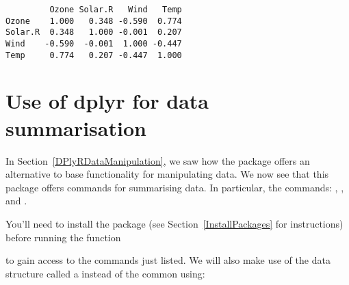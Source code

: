 \begin{knitrout}
\color{fgcolor}\begin{kframe}
\begin{alltt}
\hlstd{> }\hlstd{(}\hlstd{(}
\hlstd{   } \hlstd{=} \hlstd{,}  \hlstd{=} \hlstd{),} \hlstd{)}
\end{alltt}
\begin{verbatim}
         Ozone Solar.R   Wind   Temp
Ozone    1.000   0.348 -0.590  0.774
Solar.R  0.348   1.000 -0.001  0.207
Wind    -0.590  -0.001  1.000 -0.447
Temp     0.774   0.207 -0.447  1.000
\end{verbatim}
\end{kframe}
\end{knitrout}
 
 
 
 
\section{Use of dplyr for data summarisation} 
\label{DPlyRDataSummarisation} 
 
 
In Section~\ref{DPlyRDataManipulation}, we saw how the  package offers an alternative to base \R{} functionality for manipulating data. We now see that this package offers commands for summarising data. In particular, the commands: , , and . 
   
You'll need to install the package (see Section~\ref{InstallPackages} for instructions) before running the function 
\begin{knitrout}
\color{fgcolor}\begin{kframe}
\begin{alltt}
\hlstd{> }
\end{alltt}
\end{kframe}
\end{knitrout}
to gain access to the commands just listed. We will also make use of the  data structure called a  instead of the common  using: 
\begin{knitrout}
\color{fgcolor}\begin{kframe}
\begin{alltt}
\hlstd{> }\hlkwb{=}
\end{alltt}
\end{kframe}
\end{knitrout}
 
